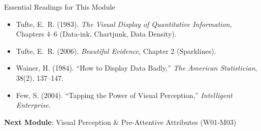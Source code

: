 \documentclass[10pt]{beamer}
\begin{document}
\begin{frame}{Essential Readings for This Module}
  \begin{itemize}
    \item Tufte, E.~R. (1983). \emph{The Visual Display of Quantitative
          Information}, Chapters 4--6 (Data-ink, Chartjunk, Data Density).
    \item Tufte, E.~R. (2006). \emph{Beautiful Evidence}, Chapter 2
          (Sparklines).
    \item Wainer, H. (1984). ``How to Display Data Badly,''
          \emph{The American Statistician}, 38(2), 137--147.
    \item Few, S. (2004). ``Tapping the Power of Visual Perception,''
          \emph{Intelligent Enterprise}.
  \end{itemize}

  \vspace{6pt}
  \textbf{Next Module}: Visual Perception \& Pre-Attentive Attributes (W01-M03)
\end{frame}
\end{document}
